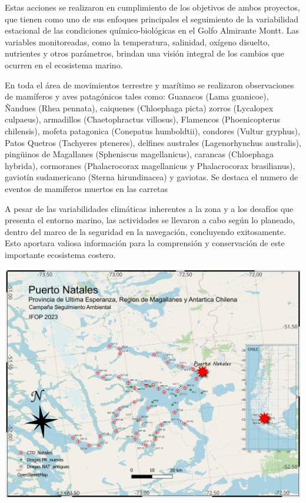 \documentclass[
  letterpaper,
  DIV=11,
  numbers=noendperiod]{scrartcl}
\begin{document}
Estas acciones se realizaron en cumplimiento de los objetivos de ambos
proyectos, que tienen como uno de sus enfoques principales el
seguimiento de la variabilidad estacional de las condiciones
químico-biológicas en el Golfo Almirante Montt. Las variables
monitoreadas, como la temperatura, salinidad, oxígeno disuelto,
nutrientes y otros parámetros, brindan una visión integral de los
cambios que ocurren en el ecosistema marino.

En toda el área de movimientos terrestre y marítimo se realizaron
observaciones de mamíferos y aves patagónicos tales como: Guanacos (Lama
guanicoe), Ñandues (Rhea pennata), caiquenes (Chloephaga picta) zorros
(Lycalopex culpaeus), armadillos (Chaetophractus villosus), Flamencos
(Phoenicopterus chilensis), mofeta patagonica (Conepatus humboldtii),
condores (Vultur gryphus), Patos Quetros (Tachyeres pteneres), delfines
australes (Lagenorhynchus australis), pingüinos de Magallanes
(Spheniscus magellanicus), carancas (Chloephaga hybrida), cormoranes
(Phalacrocorax magellanicus y Phalacrocorax brasilianus), gaviotín
sudamericano (Sterna hirundinacea) y gaviotas. Se destaca el numero de
eventos de mamíferos muertos en las carretas

A pesar de las variabilidades climáticas inherentes a la zona y a los
desafíos que presenta el entorno marino, las actividades se llevaron a
cabo según lo planeado, dentro del marco de la seguridad en la
navegación, concluyendo exitosamente. Esto aportara valiosa información
para la comprensión y conservación de este importante ecosistema
costero.

\includegraphics{images/Mapa natales_5.jpeg}
\end{document}
